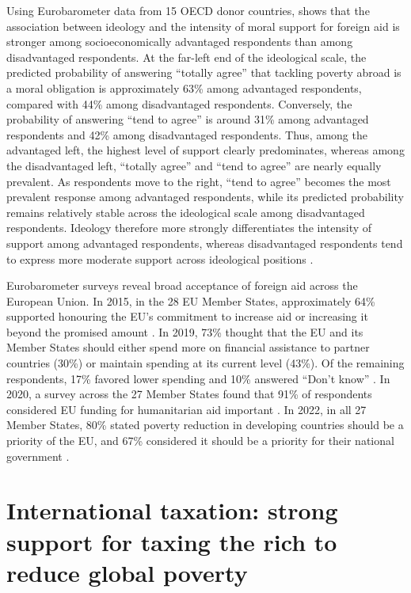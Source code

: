 \documentclass[11pt,a4paper]{article}
\begin{document}
Using Eurobarometer data from 15 OECD donor countries, \citet{cho_ideology_2024} shows that the association between ideology and the intensity of moral support for foreign aid is stronger among socioeconomically advantaged respondents than among disadvantaged respondents. At the far-left end of the ideological scale, the predicted probability of answering ``totally agree'' that tackling poverty abroad is a moral obligation is approximately 63\% among advantaged respondents, compared with 44\% among disadvantaged respondents. Conversely, the probability of answering ``tend to agree'' is around 31\% among advantaged respondents and 42\% among disadvantaged respondents. Thus, among the advantaged left, the highest level of support clearly predominates, whereas among the disadvantaged left, ``totally agree'' and ``tend to agree'' are nearly equally prevalent. As respondents move to the right, ``tend to agree'' becomes the most prevalent response among advantaged respondents, while its predicted probability remains relatively stable across the ideological scale among disadvantaged respondents. Ideology therefore more strongly differentiates the intensity of support among advantaged respondents, whereas disadvantaged respondents tend to express more moderate support across ideological positions \citep[Figure 1]{cho_ideology_2024}.

Eurobarometer surveys reveal broad acceptance of foreign aid across the European Union. In 2015, in the 28 EU Member States, approximately 64\% supported honouring the EU's commitment to increase aid or increasing it beyond the promised amount \citep{european_commission_2015_eurobarometer}. 
In 2019, 73\% thought that the EU and its Member States should either spend more on financial assistance to partner countries (30\%) or maintain spending at its current level (43\%). Of the remaining respondents, 17\% favored lower spending and 10\% answered ``Don't know'' \citep{european_commission_2019_development}.
In 2020, a survey across the 27 Member States found that 91\% of respondents considered EU funding for humanitarian aid important \citep{european_commission_2021_humanitarian}.
In 2022, in all 27 Member States, 80\% stated poverty reduction in developing countries should be a priority of the EU, and 67\% considered it should be a priority for their national government \citep{european_commission_2022_development}. 

\section{International taxation: strong support for taxing the rich to reduce global poverty}
\end{document}

